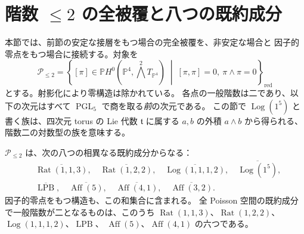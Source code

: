 \section{階数 \texorpdfstring{$\leq2$}{at most 2} の全被覆と八つの既約成分}
\label{sec:rank2-global-eight}

本節では、前節の安定な接層をもつ場合の完全被覆を、非安定な場合と
因子的零点をもつ場合に接続する。対象を
\[
 \mathcal P_{\leq2}
 =\left\{[\pi]\in
 \mathbb P H^0(\mathbb P^4,\textstyle\bigwedge^2T_{\mathbb P^4})
 \;\middle|\;[\pi,\pi]=0,\ \pi\wedge\pi=0\right\}_{\mathrm{red}}
\]
とする。射影化により零構造は除かれている。
各点の一般階数は二であり、以下の次元はすべて
$\operatorname{PGL}_5$ で商を取る\emph{前}の次元である。
この節で $\operatorname{Log}(1^5)$ と書く族は、四次元 torus の Lie 代数
$\mathfrak t$ に属する $a,b$ の外積 $a\wedge b$ から得られる、
階数二の対数型の族を意味する。

\begin{theorem}[階数二の被約空間の完全被覆]
\label{thm:rank2-eight}
$\mathcal P_{\leq2}$ は、次の八つの相異なる既約成分からなる：
\begin{align*}
 &\overline{\operatorname{Rat}(1,1,3)},\quad
  \overline{\operatorname{Rat}(1,2,2)},\quad
  \overline{\operatorname{Log}(1,1,1,2)},\quad
  \overline{\operatorname{Log}(1^5)},\\
 &\overline{\operatorname{LPB}},\quad
  \overline{\operatorname{Aff}(5)},\quad
  \overline{\operatorname{Aff}(4,1)},\quad
  \overline{\operatorname{Aff}(3,2)}.
\end{align*}
因子的零点をもつ構造も、この和集合に含まれる。
全 Poisson 空間の既約成分で一般階数が二となるものは、このうち
$\operatorname{Rat}(1,1,3)$、$\operatorname{Rat}(1,2,2)$、
$\operatorname{Log}(1,1,1,2)$、$\operatorname{LPB}$、
$\operatorname{Aff}(5)$、$\operatorname{Aff}(4,1)$ の六つである。
\end{theorem}


